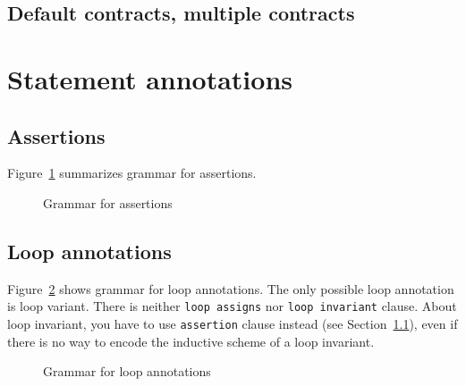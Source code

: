 \subsection{Default contracts, multiple contracts}
\label{sec:multiplecontracts}

\nodiff


\section{Statement annotations}


\subsection{Assertions}
\label{sec:assertions}

\nodiff

Figure~\ref{fig:gram:assertions} summarizes grammar for assertions.
\begin{figure}[htbp]
  \begin{cadre}
    
  \end{cadre}
  \caption{Grammar for assertions}
  \label{fig:gram:assertions}
\end{figure}


\subsection{Loop annotations}
\label{sec:loop_annot}


Figure~\ref{fig:gram:loops} shows grammar for loop annotations. The only
possible loop annotation is loop variant. There is neither
\lstinline|loop assigns| nor \lstinline|loop invariant| clause. About loop
invariant, you have to use \lstinline|assertion| clause instead (see
Section~\ref{sec:assertions}), even if there is no way to encode the inductive
scheme of a loop invariant.
\begin{figure}[htbp]
  \begin{cadre}
    
  \end{cadre}
  \caption{Grammar for loop annotations}
  \label{fig:gram:loops}
\end{figure}

